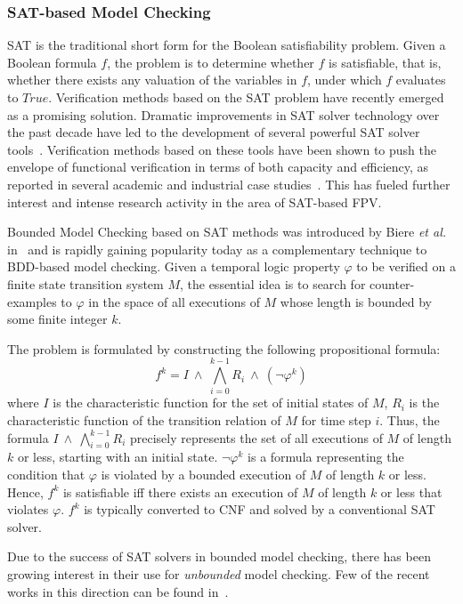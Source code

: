 \subsubsection{SAT-based Model Checking}
SAT is the traditional short form for the Boolean satisfiability problem. 
Given a Boolean formula $f$, the problem is to determine whether $f$ is 
satisfiable, that is, whether there exists any valuation of the variables 
in $f$, under which $f$ evaluates to $True$.
Verification methods based on the SAT problem have recently
emerged as a promising solution. Dramatic improvements in
SAT solver technology over the past decade have led to the
development of several powerful SAT solver 
tools~\cite{goldberg,zchaff,silva:99,quaffle}. 
Verification methods based on these tools have been shown
to push the envelope of functional verification in terms of
both capacity and efficiency, as reported in several academic
and industrial case 
studies~\cite{amla:03,amla:05,biere:99c}. 
This has fueled further interest and intense research activity in the area 
of SAT-based FPV.

\noindent
Bounded Model Checking based on SAT methods was introduced by Biere {\em et 
al.} in~\cite{biere:99a,biere:99,clarke:01} and is rapidly gaining popularity 
today as a complementary technique to BDD-based model checking. 
Given a temporal 
logic property $\varphi$ to be verified on a finite state transition system 
$M$, the essential idea is to search for counter-examples to $\varphi$ in the 
space of all executions of $M$ whose length is bounded by some finite 
integer $k$.

\noindent
The problem is formulated by constructing the following propositional formula:
	\[ f^k = I\ \land\ \bigwedge_{i=0}^{k-1} R_i\ \land\ (\lnot\varphi^k) \]
where $I$ is the characteristic function for the set of initial states of $M$, 
$R_i$ is the characteristic function of the transition relation of $M$ for 
time step $i$. Thus, the formula $I\ \land\ \bigwedge_{i=0}^{k-1} R_i$ 
precisely represents the set of all executions of $M$ of length $k$ or less, 
starting with an initial state. $\lnot\varphi^k$ is a formula representing 
the condition that $\varphi$ is violated by a bounded execution of $M$ of 
length $k$ or less. Hence, $f^k$ is satisfiable iff there exists an execution 
of $M$ of length $k$ or less that violates $\varphi$. $f^k$ is typically 
converted to CNF and solved by a conventional SAT solver.

\noindent
Due to the success of SAT solvers in bounded model checking, there has been 
growing interest in their use for {\em unbounded} model checking. Few of 
the recent works in this direction can be found in~\cite{kang:03,mcmillan:02}.

